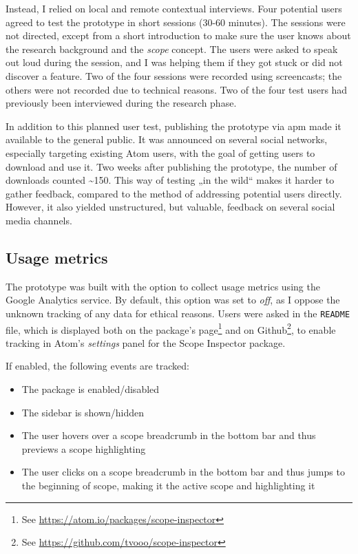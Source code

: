 Instead, I relied on local and remote contextual interviews. Four
potential users agreed to test the prototype in short sessions (30-60
minutes). The sessions were not directed, except from a short
introduction to make sure the user knows about the research background
and the \emph{scope} concept. The users were asked to speak out loud
during the session, and I was helping them if they got stuck or did not
discover a feature. Two of the four sessions were recorded using
screencasts; the others were not recorded due to technical reasons. Two
of the four test users had previously been interviewed during the
research phase.

In addition to this planned user test, publishing the prototype via
\ac{apm} made it available to the general public. It was announced on
several social networks, especially targeting existing Atom users, with
the goal of getting users to download and use it. Two weeks after
publishing the prototype, the number of downloads counted
\textasciitilde{}150. This way of testing „in the wild“ makes it harder
to gather feedback, compared to the method of addressing potential users
directly. However, it also yielded unstructured, but valuable, feedback
on several social media channels.

\subsection{Usage metrics}\label{usage-metrics}

The prototype was built with the option to collect usage metrics using
the Google Analytics service. By default, this option was set to
\emph{off}, as I oppose the unknown tracking of any data for ethical
reasons. Users were asked in the \texttt{README} file, which is
displayed both on the package’s
page\footnote{See \url{https://atom.io/packages/scope-inspector}} and on
Github\footnote{See \url{https://github.com/tvooo/scope-inspector}}, to
enable tracking in Atom’s \emph{settings} panel for the Scope Inspector
package.

If enabled, the following events are tracked:

\begin{itemize}
\itemsep1pt\parskip0pt
\item
  The package is enabled/disabled
\item
  The sidebar is shown/hidden
\item
  The user hovers over a scope breadcrumb in the bottom bar and thus
  previews a scope highlighting
\item
  The user clicks on a scope breadcrumb in the bottom bar and thus jumps
  to the beginning of scope, making it the active scope and highlighting
  it
\end{itemize}


